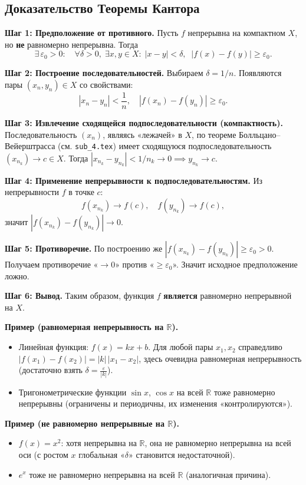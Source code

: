 \medskip


\subsection*{Доказательство Теоремы Кантора}

\textbf{Шаг 1: Предположение от противного.}  
Пусть $f$ непрерывна на компактном $X$, но \textbf{не} равномерно непрерывна. Тогда
\[
\exists\,\varepsilon_0>0 :\quad
\forall \delta>0,\;\exists x,y\in X:\;
|x-y|<\delta,\;\;
|f(x)-f(y)| \ge \varepsilon_0.
\]

\textbf{Шаг 2: Построение последовательностей.}  
Выбираем $\delta=1/n$. Появляются пары $(x_n, y_n)\in X$ со свойствами:
\[
|x_n - y_n| < \frac{1}{n},\quad
|f(x_n) - f(y_n)| \ge \varepsilon_0.
\]

\textbf{Шаг 3: Извлечение сходящейся подпоследовательности (компактность).}  
Последовательность $(x_n)$, являясь «лежачей» в $X$, по теореме Болльцано–Вейерштрасса (см. \texttt{sub\_4.tex}) имеет сходящуюся подпоследовательность $(x_{n_k})\to c\in X$. Тогда $|x_{n_k}-y_{n_k}| < 1/{n_k}\to0 \implies y_{n_k}\to c$.

\textbf{Шаг 4: Применение непрерывности к подпоследовательностям.}  
Из непрерывности $f$ в точке $c$: 
\[
f(x_{n_k}) \to f(c),
\quad
f(y_{n_k}) \to f(c),
\]
значит \(|f(x_{n_k}) - f(y_{n_k})|\to 0\).

\textbf{Шаг 5: Противоречие.}  
По построению же \(|f(x_{n_k}) - f(y_{n_k})|\ge \varepsilon_0>0\). Получаем противоречие «\(\to 0\)» против «\(\ge \varepsilon_0\)». Значит исходное предположение ложно.

\textbf{Шаг 6: Вывод.}  
Таким образом, функция $f$ \textbf{является} равномерно непрерывной на $X$.

\medskip


\textbf{Пример (равномерная непрерывность на $\mathbb{R}$).}
\begin{itemize}
  \item Линейная функция: $f(x)=kx+b$. Для любой пары $x_1, x_2$ справедливо $|f(x_1)-f(x_2)|=|k|\,|x_1-x_2|$, здесь очевидна равномерная непрерывность (достаточно взять $\delta=\tfrac{\varepsilon}{|k|}$).
  \item Тригонометрические функции $\sin x$, $\cos x$ на всей $\mathbb{R}$ тоже равномерно непрерывны (ограничены и периодичны, их изменения «контролируются»).
\end{itemize}

\textbf{Пример (не равномерно непрерывные на $\mathbb{R}$).}
\begin{itemize}
  \item $f(x)=x^2$: хотя непрерывна на $\mathbb{R}$, она не равномерно непрерывна на всей оси (с ростом $x$ глобальная «\(\delta\)» становится недостаточной).
  \item $e^x$ тоже не равномерно непрерывна на всей $\mathbb{R}$ (аналогичная причина).
\end{itemize}

\medskip

